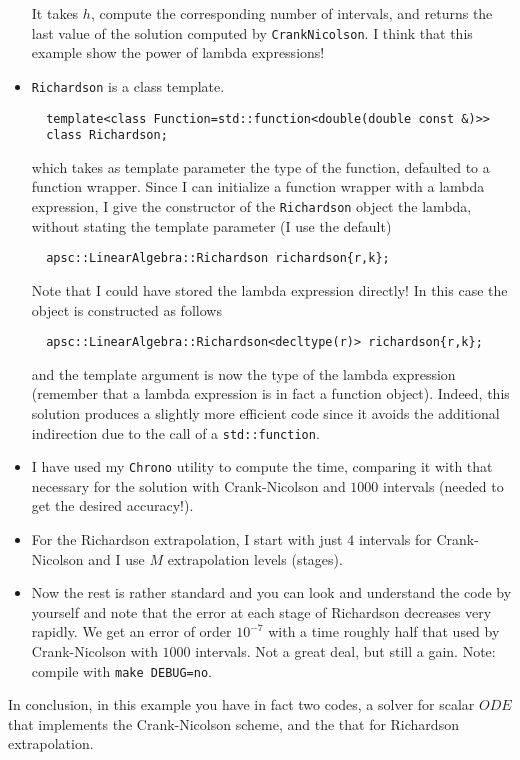 \documentclass[10pt,a4paper,twoside]{article}
\begin{document}
\begin{itemize}
\begin{lstlisting}
\end{lstlisting}
It takes $h$, compute the corresponding number of intervals, and returns the last value of the solution computed by \lstinline!CrankNicolson!.
I think that this example show the power of lambda expressions!
\item \lstinline!Richardson! is a class template.
\begin{lstlisting}
  template<class Function=std::function<double(double const &)>>
  class Richardson;
\end{lstlisting}
  which takes as template parameter the type of the function, defaulted to a function wrapper. Since I can initialize a function wrapper with a lambda expression, I give the constructor of the \lstinline!Richardson! object the lambda, without stating the template parameter (I use the default)
\begin{lstlisting}
  apsc::LinearAlgebra::Richardson richardson{r,k};
\end{lstlisting}
  Note that I could have stored the lambda expression directly! In this case the object is constructed as follows
\begin{lstlisting}
  apsc::LinearAlgebra::Richardson<decltype(r)> richardson{r,k};
\end{lstlisting}
  and the template argument is now the type of the lambda expression (remember that a lambda expression is in fact a function object). Indeed, this solution produces a slightly more efficient code since it avoids the additional indirection due to the call of a \lstinline!std::function!.
\item I have used my \lstinline!Chrono! utility to compute the time, comparing it with that necessary for the solution with Crank-Nicolson
  and $1000$ intervals (needed to get the desired accuracy!).
  \item For the Richardson extrapolation, I start with just $4$ intervals for Crank-Nicolson and I use $M$ extrapolation levels (stages). 
  \item Now the rest is rather standard and you can look and understand the code by yourself and note that the error at each stage of Richardson decreases very rapidly. We get an error of order $10^{-7}$ with a time roughly half that used by Crank-Nicolson with $1000$ intervals. Not a great deal, but still a gain. Note: compile with \verb!make DEBUG=no!.
\end{itemize}

In conclusion, in this example you have in fact two codes, a solver for scalar $ODE$ that implements the Crank-Nicolson scheme, and the that for Richardson extrapolation.
\end{document}
